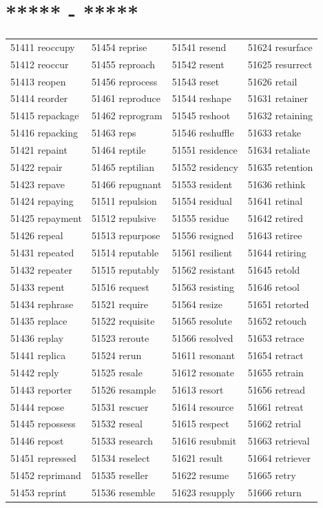\documentclass[10pt, oneside]{book}
\begin{document}
\begin{table}[h]
	\centering
	\section*{***** - *****}
	\begin{tabular}{l l l l}
51411 reoccupy &51454 reprise &51541 resend &51624 resurface\\
51412 reoccur &51455 reproach &51542 resent &51625 resurrect\\
51413 reopen &51456 reprocess &51543 reset &51626 retail\\
51414 reorder &51461 reproduce &51544 reshape &51631 retainer\\
51415 repackage &51462 reprogram &51545 reshoot &51632 retaining\\
51416 repacking &51463 reps &51546 reshuffle &51633 retake\\
51421 repaint &51464 reptile &51551 residence &51634 retaliate\\
51422 repair &51465 reptilian &51552 residency &51635 retention\\
51423 repave &51466 repugnant &51553 resident &51636 rethink\\
51424 repaying &51511 repulsion &51554 residual &51641 retinal\\
51425 repayment &51512 repulsive &51555 residue &51642 retired\\
51426 repeal &51513 repurpose &51556 resigned &51643 retiree\\
51431 repeated &51514 reputable &51561 resilient &51644 retiring\\
51432 repeater &51515 reputably &51562 resistant &51645 retold\\
51433 repent &51516 request &51563 resisting &51646 retool\\
51434 rephrase &51521 require &51564 resize &51651 retorted\\
51435 replace &51522 requisite &51565 resolute &51652 retouch\\
51436 replay &51523 reroute &51566 resolved &51653 retrace\\
51441 replica &51524 rerun &51611 resonant &51654 retract\\
51442 reply &51525 resale &51612 resonate &51655 retrain\\
51443 reporter &51526 resample &51613 resort &51656 retread\\
51444 repose &51531 rescuer &51614 resource &51661 retreat\\
51445 repossess &51532 reseal &51615 respect &51662 retrial\\
51446 repost &51533 research &51616 resubmit &51663 retrieval\\
51451 repressed &51534 reselect &51621 result &51664 retriever\\
51452 reprimand &51535 reseller &51622 resume &51665 retry\\
51453 reprint &51536 resemble &51623 resupply &51666 return\\
	\end{tabular}
 \end{table}
\end{document}
